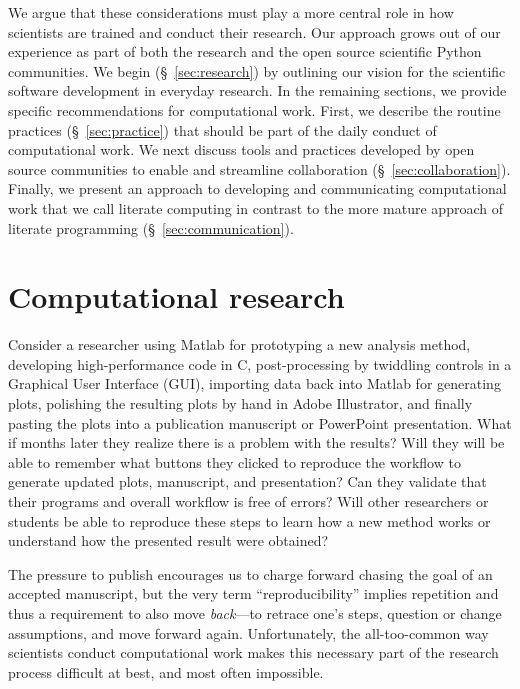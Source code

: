 \documentclass[ChapterTOCs,krantz2]{krantz} %
\begin{document}
We argue that these considerations must play a more central role in how
scientists are trained and conduct their research. Our approach grows out of
our experience as part of both the research and the open source scientific
Python communities.  We begin (§~\ref{sec:research}) by outlining our vision
for the scientific software development in everyday research. In the remaining
sections, we provide specific recommendations for computational work.  First,
we describe the routine practices (§~\ref{sec:practice}) that should be part of
the daily conduct of computational work. We next discuss tools and practices
developed by open source communities to enable and streamline collaboration
(§~\ref{sec:collaboration}). Finally, we present an approach to developing and
communicating computational work that we call literate computing in contrast to
the more mature approach of literate programming (§~\ref{sec:communication}).

\section{\label{sec:research}Computational research}

Consider a researcher using Matlab for prototyping a new analysis method,
developing high-performance code in C, post-processing by twiddling controls in
a Graphical User Interface (GUI), importing data back into Matlab for
generating plots, polishing the resulting plots by hand in Adobe Illustrator,
and finally pasting the plots into a publication manuscript or PowerPoint
presentation. What if months later they realize there is a problem with the
results? Will they will be able to remember what buttons they clicked to
reproduce the workflow to generate updated plots, manuscript, and presentation?
Can they validate that their programs and overall workflow is free of errors?
Will other researchers or students be able to reproduce these steps to learn
how a new method works or understand how the presented result were obtained?

The pressure to publish encourages us to charge forward chasing the goal of an
accepted manuscript, but the very term ``reproducibility'' implies repetition
and thus a requirement to also move \emph{back}---to retrace one's steps,
question or change assumptions, and move forward again. Unfortunately, the
all-too-common way scientists conduct computational work makes this necessary
part of the research process difficult at best, and most often impossible.
\end{document}
